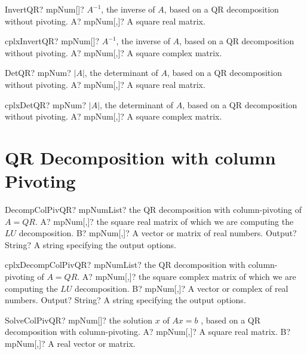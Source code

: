 \documentclass[12pt,a4paper,openany]{book}
\begin{document}
\begin{mpFunctionsExtract}
\mpFunctionOne
{InvertQR? mpNum[]? $A^{-1}$, the inverse of $A$, based on a QR decomposition without pivoting.}
{A? mpNum[,]? A square real matrix.}
\end{mpFunctionsExtract}

\begin{mpFunctionsExtract}
\mpFunctionOne
{cplxInvertQR? mpNum[]? $A^{-1}$, the inverse of $A$, based on a QR decomposition without pivoting.}
{A? mpNum[,]? A square complex matrix.}
\end{mpFunctionsExtract}

\begin{mpFunctionsExtract}
\mpFunctionOne
{DetQR? mpNum? $|A|$, the determinant of $A$, based on a QR decomposition without pivoting.}
{A? mpNum[,]? A square real matrix.}
\end{mpFunctionsExtract}

\begin{mpFunctionsExtract}
\mpFunctionOne
{cplxDetQR? mpNum? $|A|$, the determinant of $A$, based on a QR decomposition without pivoting.}
{A? mpNum[,]? A square complex matrix.}
\end{mpFunctionsExtract}

\section{QR Decomposition with column Pivoting}

\begin{mpFunctionsExtract}
\mpFunctionThree
{DecompColPivQR? mpNumList? the QR decomposition with column-pivoting of $A = QR$.}
{A? mpNum[,]? the square real matrix of which we are computing the $LU$ decomposition.}
{B? mpNum[,]? A vector or matrix of real numbers.}
{Output? String? A string specifying the output options.}
\end{mpFunctionsExtract}

\begin{mpFunctionsExtract}
\mpFunctionThree
{cplxDecompColPivQR? mpNumList? the QR decomposition with column-pivoting of $A = QR$.}
{A? mpNum[,]? the square complex matrix of which we are computing the $LU$ decomposition.}
{B? mpNum[,]? A vector or complex of real numbers.}
{Output? String? A string specifying the output options.}
\end{mpFunctionsExtract}

\begin{mpFunctionsExtract}
\mpFunctionTwo
{SolveColPivQR? mpNum[]? the solution $x$ of $A x = b$ , based on a QR decomposition with column-pivoting.}
{A? mpNum[,]? A square real matrix.}
{B? mpNum[,]? A real vector or matrix.}
\end{mpFunctionsExtract}
\end{document}
